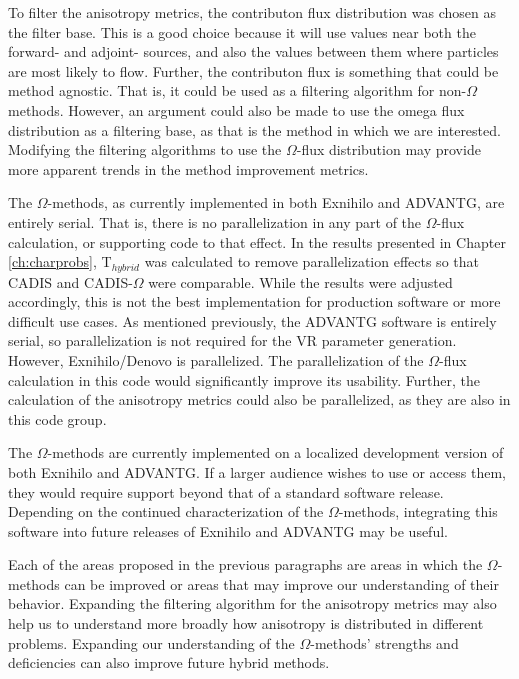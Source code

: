 To filter the anisotropy metrics, the contributon flux distribution was chosen
as the filter base. This is a good choice because it will use values near both
the forward- and adjoint- sources, and also the values between them where
particles are most likely to flow. Further, the contributon flux is something
that could be method agnostic. That is, it could be used as a filtering
algorithm for non-$\Omega$ methods. However, an argument could also be made to
use the omega flux distribution as a filtering base, as that is the method in
which we are interested. Modifying the filtering algorithms to use the
$\Omega$-flux distribution may provide more apparent trends in the method
improvement metrics.

The $\Omega$-methods, as currently implemented in both Exnihilo and ADVANTG, are
entirely serial. That is, there is no parallelization in any part of the
$\Omega$-flux calculation, or supporting code to that effect. In the results
presented in Chapter \ref{ch:charprobs}, T$_{hybrid}$ was calculated to remove
parallelization effects so that CADIS and CADIS-$\Omega$ were comparable. While
the results were adjusted accordingly, this is not the best implementation for
production software or more difficult use cases. As mentioned previously, the
ADVANTG software is entirely serial, so parallelization is not required for the
VR parameter generation. However, Exnihilo/Denovo is parallelized. The
parallelization of the $\Omega$-flux calculation in this code would significantly improve its
usability. Further, the calculation of the anisotropy metrics could also be
parallelized, as they are also in this code group.

The $\Omega$-methods are currently implemented on a localized
development version of both Exnihilo and ADVANTG. If a larger audience wishes to
use or access them, they would require support beyond that of a standard
software release. Depending on the continued characterization of the
$\Omega$-methods, integrating this software into future releases of Exnihilo and
ADVANTG may be useful.

Each of the areas proposed in the previous paragraphs are areas in which the
$\Omega$-methods can be improved or areas that may improve our understanding of
their behavior. Expanding the filtering algorithm for the anisotropy metrics may
also help us to understand more broadly how anisotropy is distributed in
different problems. Expanding our understanding of the $\Omega$-methods'
strengths and deficiencies can also improve future hybrid methods.


